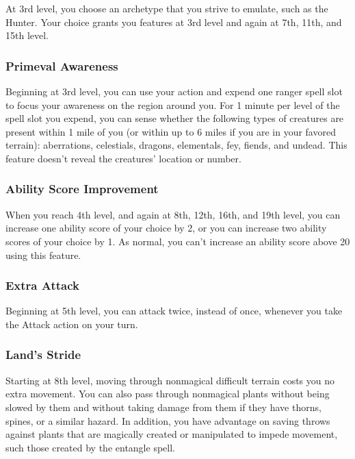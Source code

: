 \documentclass[
]{article}
\begin{document}
At 3rd level, you choose an archetype that you strive to emulate, such
as the Hunter. Your choice grants you features at 3rd level and again at
7th, 11th, and 15th level.

\hypertarget{primeval-awareness}{%
\subsubsection{Primeval Awareness}\label{primeval-awareness}}

Beginning at 3rd level, you can use your action and expend one ranger
spell slot to focus your awareness on the region around you. For 1
minute per level of the spell slot you expend, you can sense whether the
following types of creatures are present within 1 mile of you (or within
up to 6 miles if you are in your favored terrain): aberrations,
celestials, dragons, elementals, fey, fiends, and undead. This feature
doesn't reveal the creatures' location or number.

\hypertarget{ability-score-improvement}{%
\subsubsection{Ability Score
Improvement}\label{ability-score-improvement}}

When you reach 4th level, and again at 8th, 12th, 16th, and 19th level,
you can increase one ability score of your choice by 2, or you can
increase two ability scores of your choice by 1. As normal, you can't
increase an ability score above 20 using this feature.

\hypertarget{extra-attack}{%
\subsubsection{Extra Attack}\label{extra-attack}}

Beginning at 5th level, you can attack twice, instead of once, whenever
you take the Attack action on your turn.

\hypertarget{lands-stride}{%
\subsubsection{Land's Stride}\label{lands-stride}}

Starting at 8th level, moving through nonmagical difficult terrain costs
you no extra movement. You can also pass through nonmagical plants
without being slowed by them and without taking damage from them if they
have thorns, spines, or a similar hazard. In addition, you have
advantage on saving throws against plants that are magically created or
manipulated to impede movement, such those created by the entangle
spell.
\end{document}
